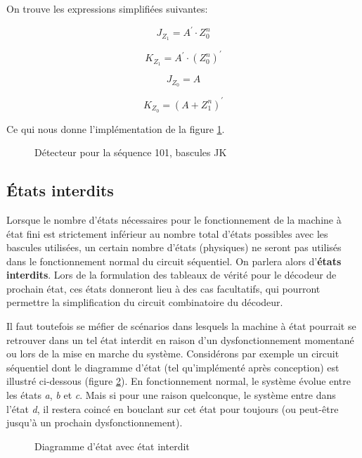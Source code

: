 \documentclass[11pt]{article}
\begin{document}
On trouve les expressions simplifiées suivantes:

$$ J_{Z_1} = A^\prime \cdot Z_0^n $$

$$ K_{Z_1} = A^\prime \cdot (Z_0^n)^\prime $$

$$ J_{Z_0} = A $$ 

$$ K_{Z_0} = (A + Z_1^n)^\prime $$

Ce qui nous donne l'implémentation de la figure \ref{fig:org6614427}.

\begin{figure}[htbp]
\centering

\caption{\label{fig:org6614427}Détecteur pour la séquence 101, bascules JK}
\end{figure}

\subsection{États interdits}
\label{sec:orga72c549}

Lorsque le nombre d'états nécessaires pour le fonctionnement de la
machine à état fini est strictement inférieur au nombre total d'états
possibles avec les bascules utilisées, un certain nombre d'états
(physiques) ne seront pas utilisés dans le fonctionnement normal du
circuit séquentiel. On parlera alors d'\textbf{états interdits}.  Lors de la
formulation des tableaux de vérité pour le décodeur de prochain état,
ces états donneront lieu à des cas facultatifs, qui pourront permettre
la simplification du circuit combinatoire du décodeur.

Il faut toutefois se méfier de scénarios dans lesquels la machine à
état pourrait se retrouver dans un tel état interdit en raison d'un
dysfonctionnement momentané ou lors de la mise en marche du
système. Considérons par exemple un circuit séquentiel dont le
diagramme d'état (tel qu'implémenté après conception) est illustré
ci-dessous (figure \ref{fig:org4a932cc}). En fonctionnement normal, le
système évolue entre les états \emph{a}, \emph{b} et \emph{c}. Mais si pour une
raison quelconque, le système entre dans l'état \emph{d}, il restera coincé
en bouclant sur cet état pour toujours (ou peut-être jusqu'à un
prochain dysfonctionnement).

\begin{figure}[htbp]
\centering

\caption{\label{fig:org4a932cc}Diagramme d'état avec état interdit}
\end{figure}
\end{document}
